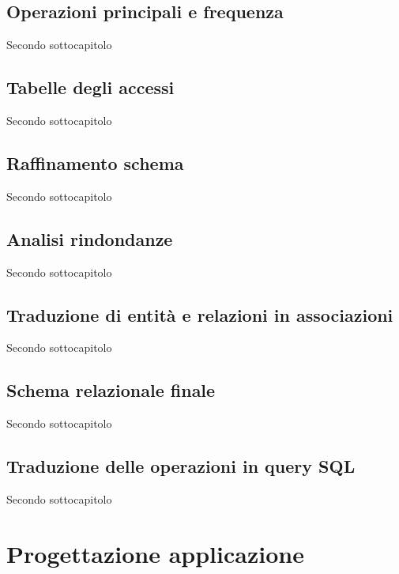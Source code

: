 ﻿\documentclass[a4paper,12pt]{report}
\begin{document}
\section{Operazioni principali e frequenza}
Secondo sottocapitolo
\section{Tabelle degli accessi}
Secondo sottocapitolo
\section{Raffinamento schema}
Secondo sottocapitolo
\section{Analisi rindondanze}
Secondo sottocapitolo
\section{Traduzione di entità e relazioni in associazioni}
Secondo sottocapitolo
\section{Schema relazionale finale}
Secondo sottocapitolo
\section{Traduzione delle operazioni in query SQL}
Secondo sottocapitolo


\chapter{Progettazione applicazione}
\end{document}
